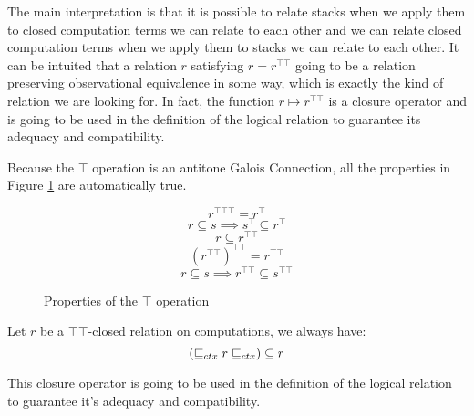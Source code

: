 The main interpretation is that it is possible to 
relate stacks 
when we apply them to closed computation terms we can relate to each other and 
we can relate closed computation terms when we apply them to stacks we can relate to
each other. 
It can be intuited that a relation $r$ satisfying $r = r^{\top\top}$ going 
to be a relation preserving observational equivalence 
in some way, which is exactly the kind of relation 
we are looking for.
In fact, the function $r \mapsto r^{\top\top}$ is a closure operator
and is going to be used in the definition 
of the logical relation to guarantee its adequacy and compatibility.


Because the $\top$ operation is an antitone Galois Connection, 
all the properties in Figure \ref{fig:galois} are automatically true.


\begin{figure}[h]
        \begin{equation*}
            r^{\top\top\top} = r^\top
        \end{equation*}
        \begin{equation*}
            r \subseteq s \implies s^\top \subseteq r^\top
        \end{equation*}
        \begin{equation*}
            r \subseteq r^{\top\top}
        \end{equation*}
        \begin{equation*}
            (r^{\top\top})^{\top\top} = r^{\top\top}
        \end{equation*}
        \begin{equation*}
            r \subseteq s \implies r^{\top\top} \subseteq s^{\top\top}
        \end{equation*}
    \caption{Properties of the $\top$ operation}
    \label{fig:galois}
\end{figure}


\begin{alemma}
    \label{lem:saturation}
    Let $r$ be a $\top\top$-closed relation on 
    computations, we always have:
    \begin{equation*}
        (\sqsubseteq_{ctx} r \sqsubseteq_{ctx}) \subseteq r 
    \end{equation*}
\end{alemma}

This closure operator is going to be used in the definition 
of the logical relation to guarantee it's adequacy and compatibility.

